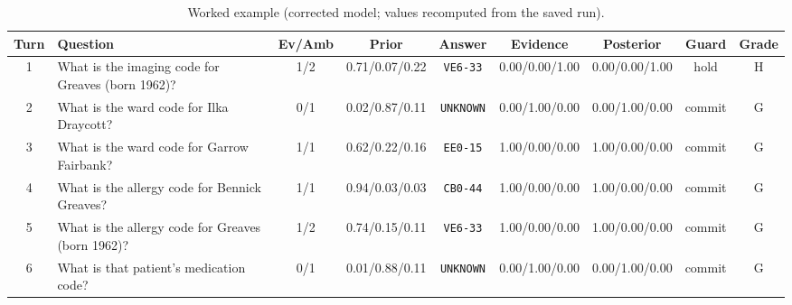 \begin{table}[H]\centering\scriptsize
\begin{tabularx}{\linewidth}{c>{\raggedright\arraybackslash}Xccccccc}\toprule
Turn & Question & Ev/Amb & Prior & Answer & Evidence & Posterior & Guard & Grade\\\midrule
1 & What is the imaging code for Greaves (born 1962)? & 1/2 & 0.71/0.07/0.22 & \texttt{VE6-33} & 0.00/0.00/1.00 & 0.00/0.00/1.00 & hold & H\\
2 & What is the ward code for Ilka Draycott? & 0/1 & 0.02/0.87/0.11 & \texttt{UNKNOWN} & 0.00/1.00/0.00 & 0.00/1.00/0.00 & commit & G\\
3 & What is the ward code for Garrow Fairbank? & 1/1 & 0.62/0.22/0.16 & \texttt{EE0-15} & 1.00/0.00/0.00 & 1.00/0.00/0.00 & commit & G\\
4 & What is the allergy code for Bennick Greaves? & 1/1 & 0.94/0.03/0.03 & \texttt{CB0-44} & 1.00/0.00/0.00 & 1.00/0.00/0.00 & commit & G\\
5 & What is the allergy code for Greaves (born 1962)? & 1/2 & 0.74/0.15/0.11 & \texttt{VE6-33} & 1.00/0.00/0.00 & 1.00/0.00/0.00 & commit & G\\
6 & What is that patient's medication code? & 0/1 & 0.01/0.88/0.11 & \texttt{UNKNOWN} & 0.00/1.00/0.00 & 0.00/1.00/0.00 & commit & G\\
\bottomrule\end{tabularx}
\caption{Worked example (corrected model; values recomputed from the saved run).\label{tab:we}}\end{table}
